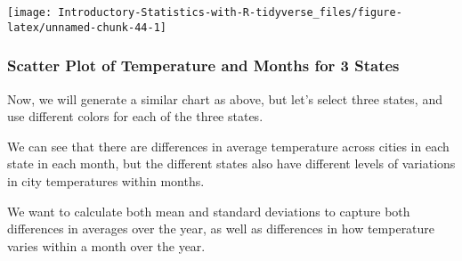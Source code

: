 \documentclass[
]{book}
\begin{document}
\begin{center}\texttt{[image: Introductory-Statistics-with-R-tidyverse\_files/figure-latex/unnamed-chunk-44-1]} \end{center}

\hypertarget{scatter-plot-of-temperature-and-months-for-3-states}{%
\subsubsection{Scatter Plot of Temperature and Months for 3 States}\label{scatter-plot-of-temperature-and-months-for-3-states}}

Now, we will generate a similar chart as above, but let's select three states, and use different colors for each of the three states.

We can see that there are differences in average temperature across cities in each state in each month, but the different states also have different levels of variations in city temperatures within months.

We want to calculate both mean and standard deviations to capture both differences in averages over the year, as well as differences in how temperature varies within a month over the year.
\end{document}
